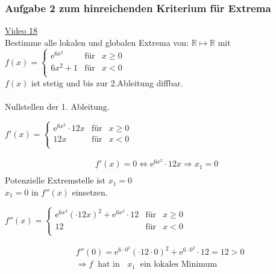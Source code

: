 \subsubsection{Aufgabe 2 zum hinreichenden Kriterium für Extrema}
\href{https://youtu.be/JRMKUC_oVdM}{Video 18}\\
Bestimme alle lokalen und globalen Extrema von: $ \mathbb{R}\longmapsto \mathbb{R} $ mit 
$f(x) =     \left\{ \begin{array}{rcl}
\mathrm{e}^{6x^2} & \mbox{für} &  x\geq 0\\
6x^2+1 & \mbox{für} & x<0 \\

\end{array}\right.$\\
$ f(x) $ ist stetig und bis zur 2.Ableitung diffbar.\\
\\
Nullstellen der 1. Ableitung.\\
\begin{center}
$f'(x) =     \left\{ \begin{array}{rcl}
\mathrm{e}^{6x^2}\cdot12x & \mbox{für} & x\geq0\\
12x & \mbox{für} & x< 0 \\

\end{array}\right.$\\
\end{center}
\begin{align*}
f'(x)=0\Leftrightarrow \mathrm{e}^{6x^2}\cdot 12x\Rightarrow x_1=0\\
\end{align*}
Potenzielle Extremstelle ist $ x_1=0 $\\
$ x_1=0 $ in $ f''(x) $ einsetzen.\\
\begin{center}
$f''(x) =     \left\{ \begin{array}{rcl}
\mathrm{e}^{6x^2}(\cdot12x)^2+\mathrm{e}^{6x^2}\cdot12 & \mbox{für} & x\geq0\\
12 & \mbox{für} & x< 0 \\

\end{array}\right.$\\
\end{center}
\begin{align*}
&f''(0)=\mathrm{e}^{6\cdot 0^2}(\cdot12\cdot 0)^2+\mathrm{e}^{6\cdot 0^2}\cdot12=12>0\\
&\Rightarrow f\;\;\text{hat in  }\;\;x_1\;\;\text{ein lokales Minimum }\\
\end{align*}
